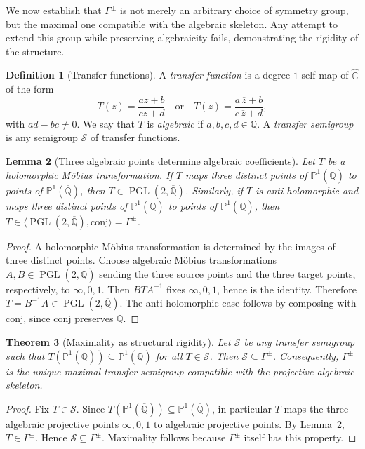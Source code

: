 \documentclass[11pt,a4paper]{article}
\theoremstyle{plain}
\newtheorem{theorem}{Theorem}[section]
\newtheorem{lemma}[theorem]{Lemma}
\theoremstyle{definition}
\newtheorem{definition}[theorem]{Definition}
\newcommand{\rsphere}{\hat{\mathbb{C}}}
\newcommand{\Alg}{\overline{\mathbb{Q}}}
\newcommand{\PAlg}{\mathbb{P}^{1}(\Alg)}
\DeclareMathOperator{\PGL}{PGL}
\newcommand{\J}{\mathrm{conj}}
\begin{document}
We now establish that $\Gamma^{\pm}$ is not merely an arbitrary choice of symmetry group, but the maximal one compatible with the algebraic skeleton. Any attempt to extend this group while preserving algebraicity fails, demonstrating the rigidity of the structure.

\begin{definition}[Transfer functions]\label{def:transfer-semigroup}
	A \emph{transfer function} is a degree-$1$ self-map of $\rsphere$ of the form
	\[
		T(z)=\frac{az+b}{cz+d}\quad\text{or}\quad
		T(z)=\frac{a\,\overline z+b}{c\,\overline z+d},
	\]
	with $ad-bc\ne0$. We say that $T$ is \emph{algebraic} if $a,b,c,d\in\Alg$.
	A \emph{transfer semigroup} is any semigroup $\mathcal S$ of transfer functions.
\end{definition}

\begin{lemma}[Three algebraic points determine algebraic coefficients]\label{lem:three-pts}
	Let $T$ be a holomorphic M\"obius transformation. If $T$ maps three distinct points of $\PAlg$ to points of $\PAlg$, then $T\in\PGL(2,\Alg)$.
	Similarly, if $T$ is anti-holomorphic and maps three distinct points of $\PAlg$ to points of $\PAlg$, then $T\in\langle \PGL(2,\Alg),\J\rangle=\Gamma^{\pm}$.
\end{lemma}
\begin{proof}
	A holomorphic Möbius transformation is determined by the images of three distinct points. Choose algebraic Möbius transformations $A,B\in\PGL(2,\Alg)$ sending the three source points and the three target points, respectively, to $\infty,0,1$. Then $BTA^{-1}$ fixes $\infty,0,1$, hence is the identity. Therefore $T=B^{-1}A\in\PGL(2,\Alg)$. The anti-holomorphic case follows by composing with $\J$, since $\J$ preserves $\Alg$.
\end{proof}

\begin{theorem}[Maximality as structural rigidity]\label{thm:maximal-transfer}
	Let $\mathcal S$ be any transfer semigroup such that $T(\PAlg)\subseteq\PAlg$ for all $T\in\mathcal S$. Then $\mathcal S\subseteq \Gamma^{\pm}$. Consequently, $\Gamma^{\pm}$ is the unique maximal transfer semigroup compatible with the projective algebraic skeleton.
\end{theorem}
\begin{proof}
	Fix $T\in\mathcal S$. Since $T(\PAlg)\subseteq\PAlg$, in particular $T$ maps the three algebraic projective points $\infty,0,1$ to algebraic projective points. By Lemma~\ref{lem:three-pts}, $T\in\Gamma^{\pm}$. Hence $\mathcal S\subseteq\Gamma^{\pm}$. Maximality follows because $\Gamma^{\pm}$ itself has this property.
\end{proof}
\end{document}
